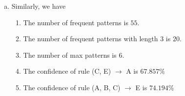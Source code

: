 \documentclass[11pt]{article}
\begin{document}
\begin{enumerate}
\begin{enumerate}[a.]
\begin{enumerate}[1.]
			\end{enumerate}
			\item Similarly, we have
			\begin{enumerate}[1.]
			\item The number of frequent patterns is $55$.
			\item The number of frequent patterns with length 3 is $20$.
			\item The number of max patterns is $6$.
			\item The confidence of rule (C, E) $\rightarrow$ A is $67.857\%$
			\item The confidence of rule (A, B, C) $\rightarrow$ E is $74.194\%$
			\end{enumerate}
		\end{enumerate}
	\end{enumerate}
\end{document}
